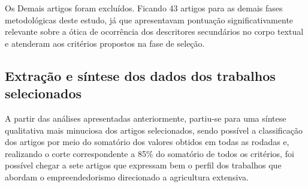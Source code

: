 \begin{table}[H]
\caption{Quantidade de artigos excluídos por critérios de seleção}
\label{tab:6}
\end{table}

Os Demais artigos foram excluídos. Ficando 43 artigos para as demais fases metodológicas deste estudo, já que apresentavam pontuação significativamente relevante sobre a ótica de ocorrência dos descritores secundários no corpo textual e atenderam aos critérios propostos na fase de seleção.

\subsection{Extração e síntese dos dados dos trabalhos selecionados}

A partir das análises apresentadas anteriormente, partiu-se para uma síntese qualitativa mais minuciosa dos artigos selecionados, sendo possível a classificação dos artigos por meio do somatório dos valores obtidos em todas as rodadas e, realizando o corte correspondente a 85\% do somatório de todos os critérios, foi possível chegar a sete artigos que expressam bem o perfil dos trabalhos que abordam o empreendedorismo direcionado a agricultura extensiva.

